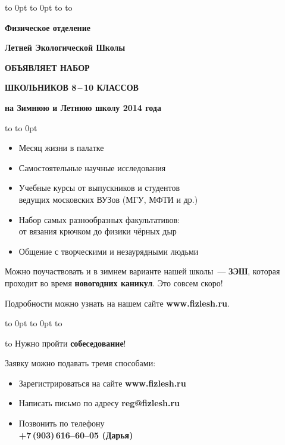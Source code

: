 \documentclass[a4paper,12pt]{article}
\begin{document}
\vbox to 0pt{%
\vbox to 0pt{\vskip8.5mm
\hbox to \vss}%
}%
\vskip28pt
\hbox to 
\vskip 34pt
\centerline{\Large\textbf{Физическое отделение}}
\vskip 10pt
\centerline{\Large\textbf{Летней Экологической Школы}}
\vskip15pt
\centerline{\huge\textsf{\textbf{ОБЪЯВЛЯЕТ НАБОР}}}
\vskip 15pt
\centerline{\huge\textsf{\textbf{ШКОЛЬНИКОВ 8\,--\,10 КЛАССОВ}}}
\vskip 10pt
\centerline{\Large\textbf{на Зимнюю и Летнюю школу {\Huge 2014} года}}
\vskip24pt
\hbox to 
\vskip-24pt\hbox to 0pt{}

{\Large%
\begin{itemize}
\setlength{\itemsep}{-4pt}
\setlength{\parindent}{0pt}
\item Месяц жизни в палатке
\item Самостоятельные научные исследования
\item Учебные курсы от выпускников и студентов\\ведущих московских ВУЗов (МГУ, МФТИ и др.)
\item Набор самых разнообразных факультативов:\\от вязания крючком до физики чёрных дыр
\item Общение с творческими и незаурядными людьми
\end{itemize}

Можно поучаствовать и в зимнем варианте нашей школы~--- \textbf{ЗЭШ},
которая проходит во время \textbf{новогодних каникул}. Это совсем скоро!

\vskip 12pt

Подробности можно узнать на нашем сайте \textbf{www.fizlesh.ru}.

\vbox to 0pt{%
\vbox to 0pt{%
\vskip21mm
\hbox to \vss}%
}%

\hbox to 
\vskip6pt
Нужно пройти \textbf{собеседование}!\par
Заявку можно подавать тремя способами:
\begin{itemize}
\setlength{\itemsep}{-4pt}
\item Зарегистрироваться на сайте \textbf{www.fizlesh.ru}
\item Написать письмо по адресу \textbf{reg@fizlesh.ru}
\item Позвонить по телефону\\
\textbf{+7\,(903)\,616--60--05 (Дарья)}
\end{itemize}
}%
\end{document}
